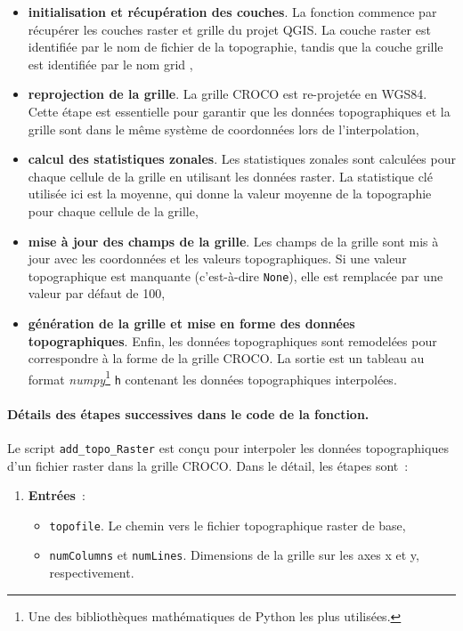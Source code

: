 {\begin{itemize}
	\item \textbf{initialisation et récupération des couches}. La fonction commence par récupérer les couches raster et grille du projet QGIS. La couche raster est identifiée par le nom de fichier de la topographie, tandis que la couche grille est identifiée par le nom \og grid \fg{},

	\item \textbf{reprojection de la grille}. La grille CROCO est re-projetée en WGS84. Cette étape est essentielle pour garantir que les données topographiques et la grille sont dans le même système de coordonnées lors de l'interpolation,

	\item \textbf{calcul des statistiques zonales}. Les statistiques zonales sont calculées pour chaque cellule de la grille en utilisant les données raster. La statistique clé utilisée ici est la moyenne, qui donne la valeur moyenne de la topographie pour chaque cellule de la grille,

	\item \textbf{mise à jour des champs de la grille}. Les champs de la grille sont mis à jour avec les coordonnées et les valeurs topographiques. Si une valeur topographique est manquante (c'est-à-dire \texttt{None}), elle est remplacée par une valeur par défaut de 100,

	\item \textbf{génération de la grille et mise en forme des données topographiques}. Enfin, les données topographiques sont remodelées pour correspondre à la forme de la grille CROCO. La sortie est un tableau au format \textit{numpy}\footnote{Une des bibliothèques mathématiques de Python les plus utilisées.} \texttt{h} contenant les données topographiques interpolées.
\end{itemize}

\paragraph{Détails des étapes successives dans le code de la fonction.\\}

Le script \texttt{add\_topo\_Raster} est conçu pour interpoler les données topographiques d'un fichier raster dans la grille CROCO. Dans le détail, les étapes sont~:

\begin{enumerate}
	\item \textbf{Entrées}~:
	\begin{itemize}
		\item \texttt{topofile}. Le chemin vers le fichier topographique raster de base,
		\item \texttt{numColumns} et \texttt{numLines}. Dimensions de la grille sur les axes x et y, respectivement.
	\end{itemize}


\end{enumerate}}
